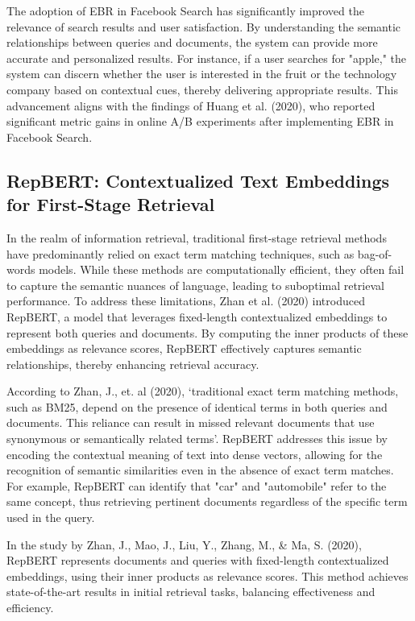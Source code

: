The adoption of EBR in Facebook Search has significantly improved the relevance of search results and user satisfaction. By understanding the semantic relationships between queries and documents, the system can provide more accurate and personalized results. For instance, if a user searches for "apple," the system can discern whether the user is interested in the fruit or the technology company based on contextual cues, thereby delivering appropriate results. This advancement aligns with the findings of Huang et al. (2020), who reported significant metric gains in online A/B experiments after implementing EBR in Facebook Search.


\subsection{RepBERT: Contextualized Text Embeddings for First-Stage Retrieval}

\noindent In the realm of information retrieval, traditional first-stage retrieval methods have predominantly relied on exact term matching techniques, such as bag-of-words models. While these methods are computationally efficient, they often fail to capture the semantic nuances of language, leading to suboptimal retrieval performance. To address these limitations, Zhan et al. (2020) introduced RepBERT, a model that leverages fixed-length contextualized embeddings to represent both queries and documents. By computing the inner products of these embeddings as relevance scores, RepBERT effectively captures semantic relationships, thereby enhancing retrieval accuracy.

According to Zhan, J., et. al (2020), ‘traditional exact term matching methods, such as BM25, depend on the presence of identical terms in both queries and documents. This reliance can result in missed relevant documents that use synonymous or semantically related terms’. RepBERT addresses this issue by encoding the contextual meaning of text into dense vectors, allowing for the recognition of semantic similarities even in the absence of exact term matches. For example, RepBERT can identify that "car" and "automobile" refer to the same concept, thus retrieving pertinent documents regardless of the specific term used in the query.

In the study by Zhan, J., Mao, J., Liu, Y., Zhang, M., & Ma, S. (2020), RepBERT represents documents and queries with fixed-length contextualized embeddings, using their inner products as relevance scores. This method achieves state-of-the-art results in initial retrieval tasks, balancing effectiveness and efficiency.

